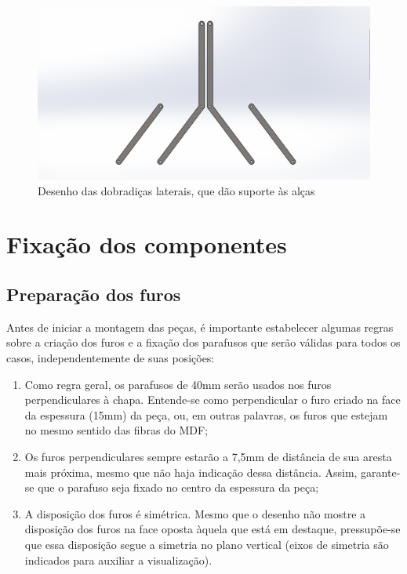 \begin{figure}[H]
    \centering
    \includegraphics[width=.7\textwidth]{Figuras/montagemMaletasEstrutura/alimentacaoDobradicaLateral.png}
    \caption{Desenho das dobradiças laterais, que dão suporte às alças}
    \label{fig:dobradicaLateral}
\end{figure}

\section{Fixação dos componentes}

\subsection{Preparação dos furos}

   \par Antes de iniciar a montagem das peças, é importante estabelecer algumas regras sobre a criação dos furos e a fixação dos parafusos que serão válidas para todos os casos, independentemente de suas posições:
    \begin{enumerate}
        \item Como regra geral, os parafusos de 40mm serão usados nos furos perpendiculares à chapa. Entende-se como perpendicular o furo criado na face da espessura (15mm) da peça, ou, em outras palavras, os furos que estejam no mesmo sentido das fibras do MDF;
        \item Os furos perpendiculares sempre estarão a 7,5mm de distância de sua aresta mais próxima, mesmo que não haja indicação dessa distância. Assim, garante-se que o parafuso seja fixado no centro da espessura da peça;
        \item A disposição dos furos é simétrica. Mesmo que o desenho não mostre a disposição dos furos na face oposta àquela que está em destaque, pressupõe-se que essa disposição segue a simetria no plano vertical (eixos de simetria são indicados para auxiliar a visualização).
        
\end{enumerate}
  
